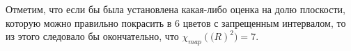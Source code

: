 \documentclass[12pt,a4paper]{article}
\begin{document}
Отметим, что если бы была установлена какая-либо оценка на долю плоскости, которую можно правильно покрасить в 6 цветов с запрещенным интервалом, то из этого следовало бы окончательно, что $\chi_{map}(\mathbb(R)^2)=7.$










\end{document}
